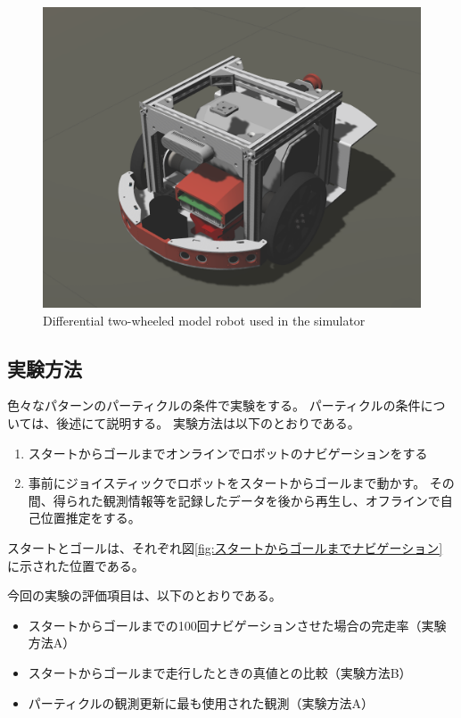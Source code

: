 \documentclass{jarticle}
\begin{document}
\begin{figure}[htbp]
  \centering
   \includegraphics[width=0.8\linewidth]{fig/raspicat_gazebo.png}
   \vspace*{-4mm}
   \caption{Differential two-wheeled model robot used in the simulator}
   \label{fig:raspicat}
\end{figure}

\subsection{実験方法}

色々なパターンのパーティクルの条件で実験をする。
パーティクルの条件については、後述にて説明する。
実験方法は以下のとおりである。
\noindent
\begin{enumerate}[A]
  \item スタートからゴールまでオンラインでロボットのナビゲーションをする
  \item 事前にジョイスティックでロボットをスタートからゴールまで動かす。
        その間、得られた観測情報等を記録したデータを後から再生し、オフラインで自己位置推定をする。
\end{enumerate}
\noindent
スタートとゴールは、それぞれ図\ref{fig:スタートからゴールまでナビゲーション}
に示された位置である。

今回の実験の評価項目は、以下のとおりである。
\begin{itemize}
  \item スタートからゴールまでの100回ナビゲーションさせた場合の完走率（実験方法A）
  \item スタートからゴールまで走行したときの真値との比較（実験方法B）
  \item パーティクルの観測更新に最も使用された観測（実験方法A）
\end{itemize}
\end{document}
